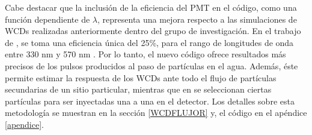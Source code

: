\documentclass[12pt,oneside,openany,letter]{book}
\begin{document}
Cabe destacar que la inclusi\'on de la eficiencia del PMT en el c\'odigo, como una funci\'on dependiente de $\lambda$, representa una mejora respecto a las simulaciones de WCDs realizadas anteriormente dentro del grupo de investigaci\'on. En el trabajo de \cite{Calderon-Ardila2015}, se toma una eficiencia única del 25\%, para el rango de longitudes de onda entre 330 nm y 570 nm \cite{calderon2015geant4}. Por lo tanto, el nuevo c\'odigo ofrece resultados m\'as precisos de los pulsos producidos al paso de part\'iculas en el agua. Además, \'este permite estimar la respuesta de los WCDs ante todo el flujo de partículas secundarias de un sitio particular, mientras que en \cite{calderon2015geant4} se seleccionan ciertas partículas para ser inyectadas una a una en el detector. Los detalles sobre esta metodología se muestran en la secci\'on \ref{WCDFLUJOR} y, el c\'odigo en el apéndice \ref{apendice}. 

\end{document}
